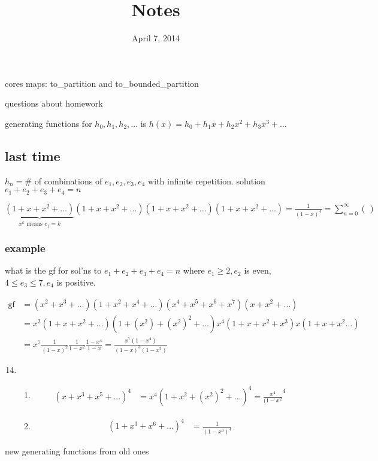 \documentclass{article}
\begin{document}
\title{Notes}
\date{April 7, 2014}
\maketitle
cores maps: to\_partition and to\_bounded\_partition

questions about homework

generating functions for $h_0,h_1,h_2,\dots$ is $h(x)=h_0+h_1x+h_2x^2+h_3x^3+\dots$

\subsection*{last time}
$h_n=$\# of combinations of $e_1,e_2,e_3,e_4$ with infinite repetition. solution $e_1+e_2+e_3+e_4=n$

$\underbrace{(1+x+x^2+\dots)}_{x^k\text{ means }e_1=k}(1+x+x^2+\dots)(1+x+x^2+\dots)(1+x+x^2+\dots)=\frac{1}{(1-x)^4}=\sum\limits_{n=0}^\infty{\binom{}{}}$

\subsubsection*{example}
what is the gf for sol'ns to $e_1+e_2+e_3+e_4=n$ where $e_1\ge2,e_2$ is even, $4\le e_3\le7, e_4$ is positive.

\begin{align*}
  \text{gf}&=(x^2+x^3+\dots)(1+x^2+x^4+\dots)(x^4+x^5+x^6+x^7)(x+x^2+\dots)\\
  &=x^2(1+x+x^2+\dots)(1+(x^2)+(x^2)^2+\dots)x^4(1+x+x^2+x^3)x(1+x+x^2\dots)\\
  &=x^7\frac{1}{(1-x)^2}\frac{1}{1-x^2}\frac{1-x^4}{1-x}=\frac{x^7(1-x^4)}{(1-x)^3(1-x^2)}
\end{align*}
\begin{enumerate}
\setcounter{enumi}{13}
\item
\begin{enumerate}
\item
\begin{align*}
  (x+x^3+x^5+\dots)^4&=x^4(1+x^2+(x^2)^2+\dots)^4=\frac{x^4}{(1-x^2}^4
\end{align*}
\item
\begin{align*}
  (1+x^3+x^6+\dots)^4&=\frac{1}{(1-x^3)^4}
\end{align*}
\end{enumerate}
\end{enumerate}

new generating functions from old ones
\end{document}
